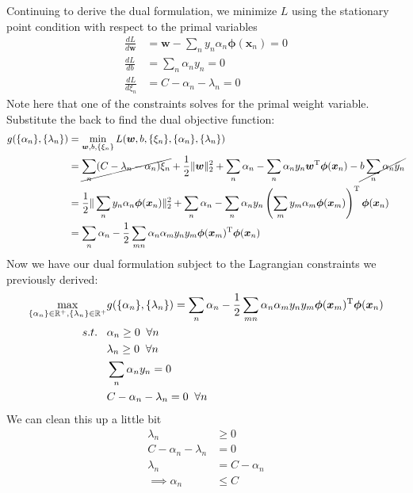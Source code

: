\documentclass[11pt]{article}
\newcommand{\vct}[1]{\boldsymbol{#1}} %
\newcommand{\T}{^{\textrm T}} %
\begin{document}
Continuing to derive the dual formulation, we minimize $L$ using the stationary point condition with respect to the primal variables
\begin{align*}
\frac{dL}{d\vct{w}} &= \vct{w} - \sum_{n} y_{n} \alpha_{n} \vct{\phi}(\vct{x}_{n}) = 0 \\
\frac{dL}{db} &= \sum_{n}  \alpha_{n} y_{n} = 0 \\
\frac{dL}{d\xi_{n}} &= C - \alpha_{n} - \lambda_{n} = 0 
\end{align*}
Note here that one of the constraints solves for the primal weight variable. Substitute the back to find the dual objective function:
\begin{align*}
g( \{\alpha_{n}\}, \{\lambda_{n}\}) &= \min_{\vct{w}, b, \{\xi_{n}\}} L(\vct{w}, b, \{\xi_{n}\}, \{\alpha_{n}\}, \{\lambda_{n}\})\\
 &= \cancel{\sum_{n} (C - \lambda_{n} - \alpha_{n}) \xi_{n}} + \frac{1}{2}\|\vct{w}\|_{2}^{2}  + \sum_{n} \alpha_{n}  - \sum_{n} \alpha_{n} y_{n}\vct{w}\T \vct{\phi}(\vct{x}_{n}) - \cancel{b\sum_{n} \alpha_{n} y_{n}}\\
 &= \frac{1}{2}\|\sum_{n} y_{n} \alpha_{n} \vct{\phi}(\vct{x}_{n})\|_{2}^{2}  + \sum_{n} \alpha_{n}  - \sum_{n} \alpha_{n} y_{n}\left(\sum_{m} y_{m} \alpha_{m} \vct{\phi}(\vct{x}_{m}) \right)\T \vct{\phi}(\vct{x}_{n}) \\
  &=  \sum_{n} \alpha_{n}  - \frac{1}{2}\sum_{mn} \alpha_{n} \alpha_{m}y_{n}y_{m}  \vct{\phi}(\vct{x}_{m})\T \vct{\phi}(\vct{x}_{n}) 
\end{align*}
Now we have our dual formulation subject to the Lagrangian constraints we previously derived:
\begin{align*}
 \max_{ \{\alpha_{n}\} \in \mathbb{R}^{+}, \{\lambda_{n}\}\in \mathbb{R}^{+}} &g( \{\alpha_{n}\}, \{\lambda_{n}\}) =  \sum_{n} \alpha_{n}  - \frac{1}{2}\sum_{mn} \alpha_{n} \alpha_{m}y_{n}y_{m}  \vct{\phi}(\vct{x}_{m})\T \vct{\phi}(\vct{x}_{n})\\
 s.t. \;\;\;& \alpha_{n} \ge 0 \;\; \forall n\\
& \lambda_{n} \ge 0 \;\; \forall n\\
 & \sum_{n}  \alpha_{n} y_{n} = 0 \\
 & C - \alpha_{n} - \lambda_{n} = 0 \;\; \forall n
\end{align*}
We can clean this up a little bit
\begin{align*}
\lambda_{n} &\ge 0\\
C - \alpha_{n} - \lambda_{n} &= 0\\
\lambda_{n}& = C - \alpha_n\\
\implies \alpha_{n} &\le C\\
\end{align*}
\end{document}

